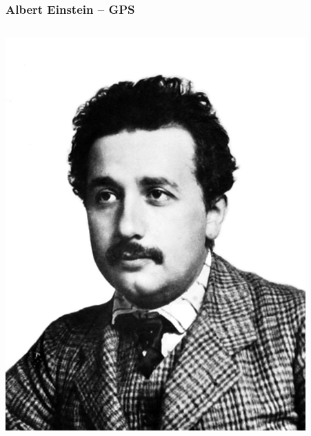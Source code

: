 \documentclass[14pt]{beamer}
\begin{document}
\begin{frame}
	\frametitle{Albert Einstein -- GPS}
	\begin{center}
		\begin{columns}
			\begin{column}{0.5\textwidth}
		\includegraphics[width=0.9\textwidth]{albert_einstein.jpg}
			\end{column}
			\begin{column}{0.5\textwidth}
			\end{column}
		\end{columns}
	\end{center}
\end{frame}
\end{document}
